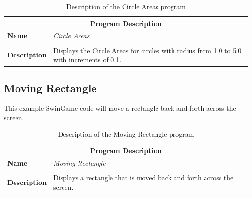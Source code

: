\begin{table}[h]
\centering
\begin{tabular}{l|p{10cm}}
  \hline
  \multicolumn{2}{c}{\textbf{Program Description}} \\
  \hline
  \textbf{Name} & \emph{Circle Areas} \\
  \\
  \textbf{Description} & Displays the Circle Areas for circles with radius from 1.0 to 5.0 with increments of 0.1. \\
  \hline
\end{tabular}
\caption{Description of the Circle Areas program}
\label{tbl:flow-circle-area}
\end{table}




\clearpage




\clearpage
\subsection{Moving Rectangle} %
\label{sub:moving_rectangle}

This example SwinGame code will move a rectangle back and forth across the screen.

\begin{table}[h]
\centering
\begin{tabular}{l|p{10cm}}
  \hline
  \multicolumn{2}{c}{\textbf{Program Description}} \\
  \hline
  \textbf{Name} & \emph{Moving Rectangle} \\
  \\
  \textbf{Description} & Displays a rectangle that is moved back and forth across the screen. \\
  \hline
\end{tabular}
\caption{Description of the Moving Rectangle program}
\label{tbl:flow-moving-rect}
\end{table}

